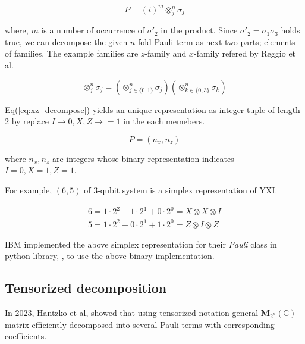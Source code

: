\documentclass[twocolumn]{article}
\begin{document}
\begin{equation}
    P = (i)^m \otimes_j^n \sigma_j
\end{equation}

where, $m$ is a number of occurrence of $\sigma'_2$ in the product.
Since $\sigma'_2 = \sigma_1 \sigma_3$ holds true, we can decompose the given $n$-fold Pauli term as next two
parts; elements of families. 
The example families are $z$-family and $x$-family refered by Reggio et al\cite{reggio_fast_2023}.

\begin{equation}
    \label{eq:xz_decompose}
    \otimes_j^n \sigma_j = \left( \otimes_{j \in \{0, 1\}}^n \sigma_j \right) \left( \otimes_{k \in \{0, 3\}}^n \sigma_k \right)
\end{equation}

Eq(\ref{eq:xz_decompose}) yields an unique representation as integer tuple of length 2 by 
replace $I \rightarrow 0, X, Z \rightarrow =1$ in the each memebers.

\begin{equation}
    P = (n_x, n_z)
\end{equation}

where $n_x, n_z$ are integers whose binary representation indicates $I=0, X=1, Z=1$.

For example, $(6, 5)$ of 3-qubit system is a simplex representation of $\text{YXI}$.

\begin{equation}
    \begin{array}{c}
        6 = 1 \cdot 2^2 +1 \cdot 2^1 + 0 \cdot 2^0 = X \otimes X \otimes I\\
        5 = 1 \cdot 2^2 +0 \cdot 2^1 + 1 \cdot 2^0 = Z \otimes I \otimes Z
    \end{array}
\end{equation}


IBM implemented the above simplex representation 
for their \textit{Pauli} class in python library, ,
to use the above binary implementation\cite{Qiskit}. 

\subsection{Tensorized decomposition}

In 2023, Hantzko et al, showed that using tensorized notation 
general $\mathbf{M}_{2^n}(\mathbb{C})$ matrix efficiently decomposed into 
several Pauli terms with corresponding coefficients\cite{hantzko_tensorized_2023}.
\end{document}
